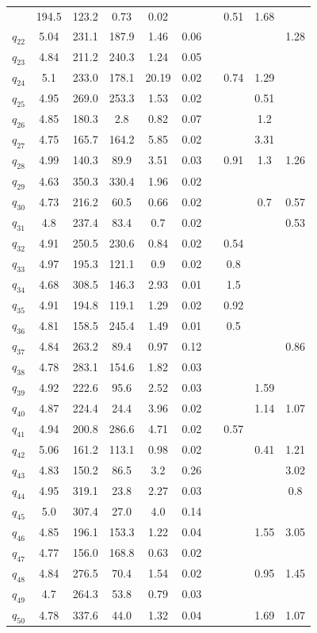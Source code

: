\documentclass[11pt]{article}
\begin{document}
\begin{table}[htbp]
{\begin{tabular}{lccccccccc}
& 194.5 & 123.2 & 0.73 & 0.02 &   &   & 0.51 & 1.68 \\  $q_{22}$ & 5.04 & 231.1 & 187.9 & 1.46 & 0.06 &   &   &   & 1.28 \\  $q_{23}$ & 4.84 & 211.2 & 240.3 & 1.24 & 0.05 &   &   &   &   \\  $q_{24}$ & 5.1 & 233.0 & 178.1 & 20.19 & 0.02 &   & 0.74 & 1.29 &   \\  $q_{25}$ & 4.95 & 269.0 & 253.3 & 1.53 & 0.02 &   &   & 0.51 &   \\  $q_{26}$ & 4.85 & 180.3 & 2.8 & 0.82 & 0.07 &   &   & 1.2 &   \\  $q_{27}$ & 4.75 & 165.7 & 164.2 & 5.85 & 0.02 &   &   & 3.31 &   \\  $q_{28}$ & 4.99 & 140.3 & 89.9 & 3.51 & 0.03 &   & 0.91 & 1.3 & 1.26 \\  $q_{29}$ & 4.63 & 350.3 & 330.4 & 1.96 & 0.02 &   &   &   &   \\  $q_{30}$ & 4.73 & 216.2 & 60.5 & 0.66 & 0.02 &   &   & 0.7 & 0.57 \\  $q_{31}$ & 4.8 & 237.4 & 83.4 & 0.7 & 0.02 &   &   &   & 0.53 \\  $q_{32}$ & 4.91 & 250.5 & 230.6 & 0.84 & 0.02 &   & 0.54 &   &   \\  $q_{33}$ & 4.97 & 195.3 & 121.1 & 0.9 & 0.02 &   & 0.8 &   &   \\  $q_{34}$ & 4.68 & 308.5 & 146.3 & 2.93 & 0.01 &   & 1.5 &   &   \\  $q_{35}$ & 4.91 & 194.8 & 119.1 & 1.29 & 0.02 &   & 0.92 &   &   \\  $q_{36}$ & 4.81 & 158.5 & 245.4 & 1.49 & 0.01 &   & 0.5 &   &   \\  $q_{37}$ & 4.84 & 263.2 & 89.4 & 0.97 & 0.12 &   &   &   & 0.86 \\  $q_{38}$ & 4.78 & 283.1 & 154.6 & 1.82 & 0.03 &   &   &   &   \\  $q_{39}$ & 4.92 & 222.6 & 95.6 & 2.52 & 0.03 &   &   & 1.59 &   \\  $q_{40}$ & 4.87 & 224.4 & 24.4 & 3.96 & 0.02 &   &   & 1.14 & 1.07 \\  $q_{41}$ & 4.94 & 200.8 & 286.6 & 4.71 & 0.02 &   & 0.57 &   &   \\  $q_{42}$ & 5.06 & 161.2 & 113.1 & 0.98 & 0.02 &   &   & 0.41 & 1.21 \\  $q_{43}$ & 4.83 & 150.2 & 86.5 & 3.2 & 0.26 &   &   &   & 3.02 \\  $q_{44}$ & 4.95 & 319.1 & 23.8 & 2.27 & 0.03 &   &   &   & 0.8 \\  $q_{45}$ & 5.0 & 307.4 & 27.0 & 4.0 & 0.14 &   &   &   &   \\  $q_{46}$ & 4.85 & 196.1 & 153.3 & 1.22 & 0.04 &   &   & 1.55 & 3.05 \\  $q_{47}$ & 4.77 & 156.0 & 168.8 & 0.63 & 0.02 &   &   &   &   \\  $q_{48}$ & 4.84 & 276.5 & 70.4 & 1.54 & 0.02 &   &   & 0.95 & 1.45 \\  $q_{49}$ & 4.7 & 264.3 & 53.8 & 0.79 & 0.03 &   &   &   &   \\  $q_{50}$ & 4.78 & 337.6 & 44.0 & 1.32 & 0.04 &   &   & 1.69 & 1.07 
\end{tabular}
}
\end{table}
\end{document}
